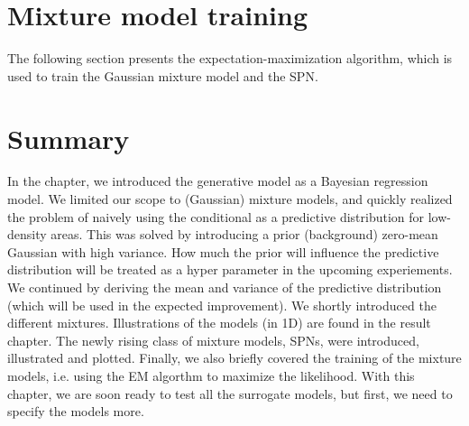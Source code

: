 




\newpage
\section{Mixture model training}
The following section presents the expectation-maximization algorithm, which is used to 
train the Gaussian mixture model and the SPN. 



\section{Summary}
In the chapter, we introduced the generative model as a Bayesian regression model. We limited our
scope to (Gaussian) mixture models, and quickly realized the problem of naively using the
conditional as a predictive distribution for low-density areas. This was solved by introducing a
prior (background) zero-mean Gaussian with high variance. How much the prior will influence the
predictive distribution will be treated as a hyper parameter in the upcoming experiements. We
continued by deriving the mean and variance of the predictive distribution (which will be used in
the expected improvement). We shortly introduced the different mixtures. Illustrations of the models
(in 1D) are found in the result chapter. The newly rising class of mixture models, SPNs, were
introduced, illustrated and plotted. Finally, we also briefly covered the training of the mixture
models, i.e. using the EM algorthm to maximize the likelihood. With this chapter, we are soon ready
to test all the surrogate models, but first, we need to specify the models more.  
